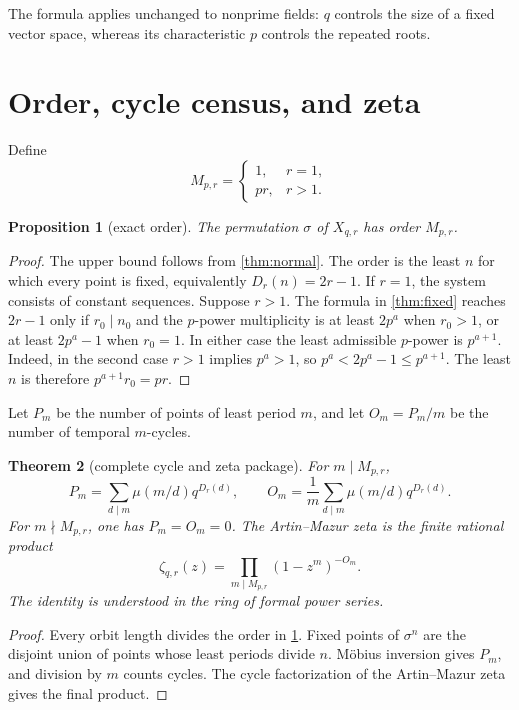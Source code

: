 \documentclass[11pt,a4paper]{amsart}
\newtheorem{theorem}{Theorem}[section]
\newtheorem{proposition}[theorem]{Proposition}
\theoremstyle{definition}
\theoremstyle{remark}
\begin{document}
The formula applies unchanged to nonprime fields: $q$ controls the size of a
fixed vector space, whereas its characteristic $p$ controls the repeated
roots.

\section{Order, cycle census, and zeta}

Define
\[
 M_{p,r}=\begin{cases}1,&r=1,\\pr,&r>1.\end{cases}
\]

\begin{proposition}[exact order]\label{prop:order}
The permutation $\sigma$ of $X_{q,r}$ has order $M_{p,r}$.
\end{proposition}

\begin{proof}
The upper bound follows from \cref{thm:normal}.  The order is the least $n$
for which every point is fixed, equivalently $D_r(n)=2r-1$.  If $r=1$, the
system consists of constant sequences.  Suppose $r>1$.  The formula in
\cref{thm:fixed} reaches $2r-1$ only if $r_0\mid n_0$ and the $p$-power
multiplicity is at least $2p^a$ when $r_0>1$, or at least $2p^a-1$ when
$r_0=1$.  In either case the least admissible $p$-power is $p^{a+1}$.
Indeed, in the second case $r>1$ implies $p^a>1$, so
$p^a<2p^a-1\leq p^{a+1}$.
The least $n$ is therefore $p^{a+1}r_0=pr$.
\end{proof}

Let $P_m$ be the number of points of least period $m$, and let $O_m=P_m/m$
be the number of temporal $m$-cycles.

\begin{theorem}[complete cycle and zeta package]\label{thm:zeta}
For $m\mid M_{p,r}$,
\[
 \boxed{P_m=\sum_{d\mid m}\mu(m/d)q^{D_r(d)},\qquad
 O_m=\frac1m\sum_{d\mid m}\mu(m/d)q^{D_r(d)}.}
\]
For $m\nmid M_{p,r}$, one has $P_m=O_m=0$.  The Artin--Mazur zeta is the
finite rational product
\[
 \boxed{\zeta_{q,r}(z)=
 \prod_{m\mid M_{p,r}}(1-z^m)^{-O_m}.}
\]
The identity is understood in the ring of formal power series.
\end{theorem}

\begin{proof}
Every orbit length divides the order in \cref{prop:order}.  Fixed points of
$\sigma^n$ are the disjoint union of points whose least periods divide $n$.
M\"obius inversion gives $P_m$, and division by $m$ counts cycles.  The cycle
factorization of the Artin--Mazur zeta \cite{ArtinMazur1965} gives the final
product.
\end{proof}
\end{document}
